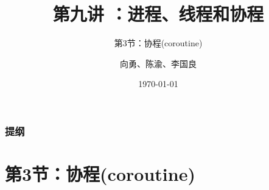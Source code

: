 



\title[第9讲]{第九讲 ：进程、线程和协程} %
\subtitle{第3节：协程(coroutine)}
\author{向勇、陈渝、李国良} %
\date{\today} %




\begin{frame}
\titlepage %
\end{frame}

\begin{frame}
\frametitle{提纲} %
\tableofcontents %
\end{frame}
\section{第3节：协程(coroutine)}%
% 

